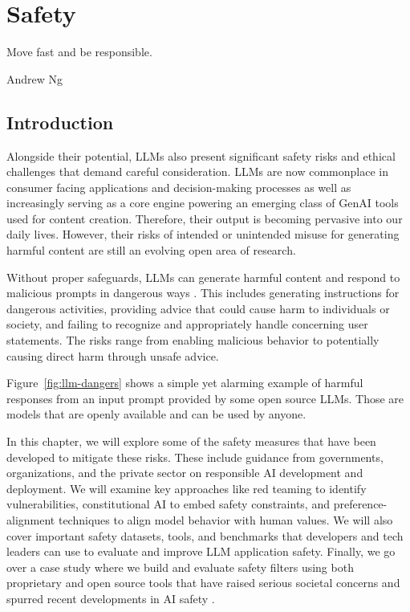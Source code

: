 \setchapterpreamble[u]{\margintoc}
\chapter{Safety}
\label{chapter:safety}


\epigraph{Move fast and be responsible.}{Andrew Ng}
\section{Introduction}

Alongside their potential, LLMs also present significant safety risks and ethical challenges that demand careful consideration. LLMs are now commonplace in consumer facing applications and decision-making processes as well as increasingly serving as a core engine powering an emerging class of GenAI tools used for content creation. Therefore, their output is becoming pervasive into our daily lives. However, their risks of intended or unintended misuse for generating harmful content are still an evolving open area of research.

Without proper safeguards, LLMs can generate harmful content and respond to malicious prompts in dangerous ways \cite{openai2024gpt4technicalreport, hartvigsen-etal-2022-toxigen}. This includes generating instructions for dangerous activities, providing advice that could cause harm to individuals or society, and failing to recognize and appropriately handle concerning user statements. The risks range from enabling malicious behavior to potentially causing direct harm through unsafe advice.

Figure~\ref{fig:llm-dangers} shows a simple yet alarming example of harmful responses from an input prompt provided by some open source LLMs. Those are models that are openly available and can be used by anyone.


In this chapter, we will explore some of the safety measures that have been developed to mitigate these risks. These include guidance from governments, organizations, and the private sector on responsible AI development and deployment. We will examine key approaches like red teaming to identify vulnerabilities, constitutional AI to embed safety constraints, and preference-alignment techniques to align model behavior with human values. We will also cover important safety datasets, tools, and benchmarks that developers and tech leaders can use to evaluate and improve LLM application safety. Finally, we go over a case study where we build and evaluate safety filters using both proprietary and open source tools that have raised serious societal concerns and spurred recent developments in AI safety \cite{pan2023rewardsjustifymeansmeasuring, wang2024decodingtrustcomprehensiveassessmenttrustworthiness}.

